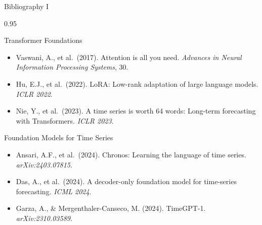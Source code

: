 \documentclass[9pt, aspectratio=169, t]{beamer}
\begin{document}
\begin{frame}{Bibliography I}
    \begin{cminipage}{0.95\textwidth}
    \begin{block}{Transformer Foundations}
        {\small
        \begin{itemize}\setlength{\itemsep}{0pt}
            \item Vaswani, A., et al.\ (2017). Attention is all you need. \textit{Advances in Neural Information Processing Systems}, 30.
            \item Hu, E.J., et al.\ (2022). LoRA: Low-rank adaptation of large language models. \textit{ICLR 2022}.
            \item Nie, Y., et al.\ (2023). A time series is worth 64 words: Long-term forecasting with Transformers. \textit{ICLR 2023}.
        \end{itemize}
        }
    \end{block}

    \begin{exampleblock}{Foundation Models for Time Series}
        {\small
        \begin{itemize}\setlength{\itemsep}{0pt}
            \item Ansari, A.F., et al.\ (2024). Chronos: Learning the language of time series. \textit{arXiv:2403.07815}.
            \item Das, A., et al.\ (2024). A decoder-only foundation model for time-series forecasting. \textit{ICML 2024}.
            \item Garza, A., \& Mergenthaler-Canseco, M. (2024). TimeGPT-1. \textit{arXiv:2310.03589}.
        \end{itemize}
        }
    \end{exampleblock}
    \end{cminipage}
\end{frame}
\end{document}
